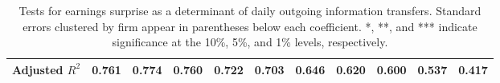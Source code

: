 \begin{table}
{\begin{tabular}{rrrrrrrrrrr}
\multicolumn{1}{|l|}{Adjusted $R^2$} &
  \multicolumn{1}{c|}{0.761} &
  \multicolumn{1}{c|}{0.774} &
  \multicolumn{1}{c|}{0.760} &
  \multicolumn{1}{c|}{0.722} &
  \multicolumn{1}{c|}{0.703} &
  \multicolumn{1}{c|}{0.646} &
  \multicolumn{1}{c|}{0.620} &
  \multicolumn{1}{c|}{0.600} &
  \multicolumn{1}{c|}{0.537} &
  \multicolumn{1}{c|}{0.417} \\ \hline
\end{tabular}}
\caption{Tests for earnings surprise as a determinant of daily outgoing information transfers.  Standard errors clustered by firm appear in parentheses below each coefficient.  *, **, and *** indicate significance at the 10\%, 5\%, and 1\% levels, respectively. }
\label{tab:TEDetOutDeg}
\end{table}

